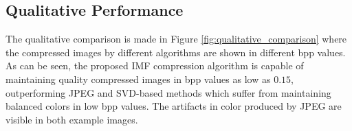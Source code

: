 \subsection{Qualitative Performance}

The qualitative comparison is made in Figure \ref{fig:qualitative_comparison} where the compressed images by different algorithms are shown in different bpp values.
As can be seen, the proposed IMF compression algorithm is capable of maintaining quality compressed images in bpp values as low as $0.15$, outperforming JPEG and SVD-based methods which suffer from maintaining balanced colors in low bpp values. The artifacts in color produced by JPEG are visible in both example images.

